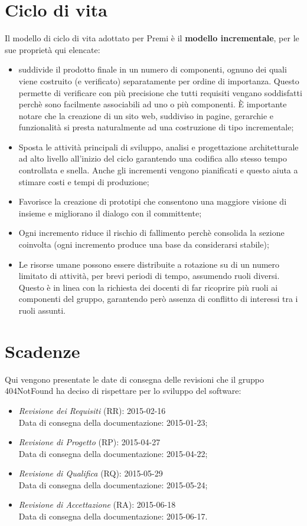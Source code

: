 \newpage
\section{Ciclo di vita}
Il modello di ciclo di vita adottato per Premi è il \textbf{modello incrementale}, per le sue proprietà qui elencate:

\begin{itemize}
	\item suddivide il prodotto finale in un numero di componenti, ognuno dei quali viene costruito (e verificato) separatamente per ordine di importanza. Questo permette di verificare con più precisione che tutti requisiti vengano soddisfatti perchè sono facilmente associabili ad uno o più componenti. È importante notare che la creazione di un sito web, suddiviso in pagine, gerarchie e funzionalità si presta naturalmente ad una costruzione di tipo incrementale;
	\item Sposta le attività principali di sviluppo, analisi e progettazione architetturale ad alto livello all'inizio del ciclo garantendo una codifica allo stesso tempo controllata e snella. Anche gli incrementi vengono pianificati e questo aiuta a stimare costi e tempi di produzione;
	\item Favorisce la creazione di prototipi che consentono una maggiore visione di insieme e migliorano il dialogo con il committente;
	\item Ogni incremento riduce il rischio di fallimento perchè consolida la sezione coinvolta (ogni incremento produce una base da considerarsi stabile);
	\item Le risorse umane possono essere distribuite a rotazione su di un numero limitato di attività, per brevi periodi di tempo, assumendo ruoli diversi. Questo è in linea con la richiesta dei docenti di far ricoprire più ruoli ai componenti del gruppo, garantendo però assenza di conflitto di interessi tra i ruoli assunti.
\end{itemize}	

\section{Scadenze}
Qui vengono presentate le date di consegna delle revisioni che il gruppo 404NotFound ha deciso di rispettare per lo sviluppo del software:

\begin{itemize}
	\item \textit{Revisione dei Requisiti} (RR): 2015-02-16 \\
	Data di consegna della documentazione: 2015-01-23;
	\item \textit{Revisione di Progetto} (RP): 2015-04-27 \\
	Data di consegna della documentazione: 2015-04-22;
	\item \textit{Revisione di Qualifica} (RQ): 2015-05-29 \\
	Data di consegna della documentazione: 2015-05-24;
	\item \textit{Revisione di Accettazione} (RA): 2015-06-18 \\
	Data di consegna della documentazione: 2015-06-17.
\end{itemize}
